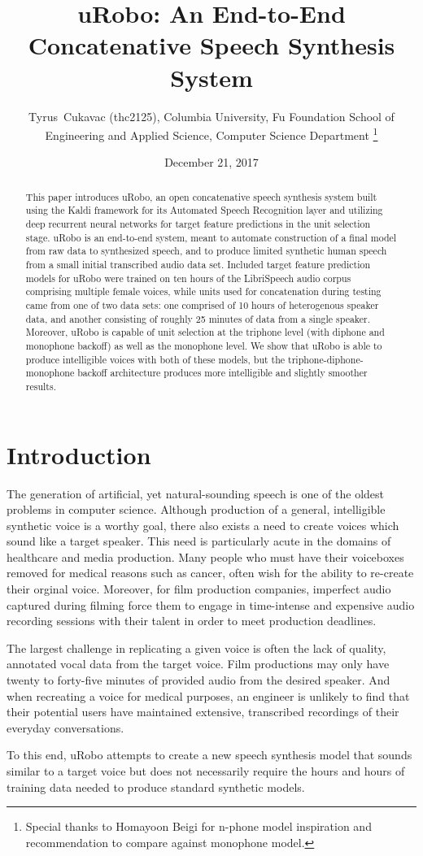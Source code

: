 \documentclass[10pt, journal, compsoc]{IEEEtran}
\author{Tyrus~Cukavac (thc2125), Columbia University, Fu Foundation School of Engineering and Applied Science, Computer Science Department%
\thanks{Special thanks to Homayoon Beigi for n-phone model inspiration and recommendation to compare against monophone model.}}
\title{uRobo: An End-to-End Concatenative Speech Synthesis System}
\date{December 21, 2017}
\begin{document}
\maketitle
\begin{abstract}
This paper introduces uRobo, an open concatenative speech synthesis system built using the Kaldi framework for its Automated Speech Recognition layer and utilizing deep recurrent neural networks for target feature predictions in the unit selection stage. uRobo is an end-to-end system, meant to automate construction of a final model from raw data to synthesized speech, and to produce limited synthetic human speech from a small initial transcribed audio data set. Included target feature prediction models for uRobo were trained on ten hours of the LibriSpeech audio corpus comprising multiple female voices, while units used for concatenation during testing came from one of two data sets: one comprised of 10 hours of heterogenous speaker data, and another consisting of roughly 25 minutes of data from a single speaker. Moreover, uRobo is capable of unit selection at the triphone level (with diphone and monophone backoff) as well as the monophone level. We show that uRobo is able to produce intelligible voices with both of these models, but the triphone-diphone-monophone backoff architecture produces more intelligible and slightly smoother results.
\end{abstract}
\section{Introduction}
The generation of artificial, yet natural-sounding speech is one of the oldest problems in computer science. Although production of a general, intelligible synthetic voice is a worthy goal, there also exists a need to create voices which sound like a target speaker. This need is particularly acute in the domains of healthcare and media production. Many people who must have their voiceboxes removed for medical reasons such as cancer, often wish for the ability to re-create their orginal voice. Moreover, for film production companies, imperfect audio captured during filming force them to engage in time-intense and expensive audio recording sessions with their talent in order to meet production deadlines.\par
The largest challenge in replicating a given voice is often the lack of quality, annotated vocal data from the target voice. Film productions may only have twenty to forty-five minutes of provided audio from the desired speaker. And when recreating a voice for medical purposes, an engineer is unlikely to find that their potential users have maintained extensive, transcribed recordings of their everyday conversations.\par
To this end, uRobo attempts to create a new speech synthesis model that sounds similar to a target voice but does not necessarily require the hours and hours of training data needed to produce standard synthetic models.
\end{document}
